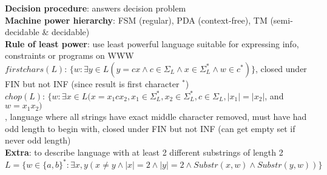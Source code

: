 \documentclass[a4paper]{article}
\begin{document}
\begin{multicols}{2}
        \textbf{Decision procedure}: answers decision problem\\
        \textbf{Machine power hierarchy}: FSM (regular), PDA (context-free), TM (semi-decidable \& decidable)\\
        \textbf{Rule of least power}: use least powerful language suitable for expressing info, constraints or programs on WWW\\
        \boldmath$firstchars(L)$\unboldmath: $\{ w : \exists y \in L (y = cx \wedge c \in \Sigma _L \wedge x \in \Sigma _L^* \wedge w \in c^*) \}$, closed under FIN but not INF (since result is first character $^*$)\\
        \boldmath$chop(L)$\unboldmath: $\{ w : \exists x \in L (x = x_1 c x_2, x_1 \in \Sigma_L^*, x_2 \in \Sigma_L^*, c \in \Sigma_L, |x_1| = |x_2|$, and $w = x_1 x_2)$\\, language where all strings have exact middle character removed, must have had odd length to begin with, closed under FIN but not INF (can get empty set if never odd length)\\
        \textbf{Extra}: to describe language with at least 2 different substrings of length 2 $L = \{ w \in {\{a,b\}}^* : \exists x, y (x \neq y \wedge |x| = 2 \wedge |y| = 2 \wedge Substr(x,w) \wedge Substr(y,w)) \}$\\
    \end{multicols}
    
\end{document}
